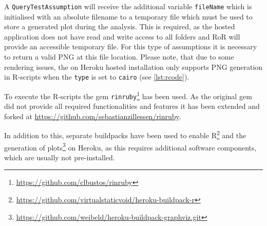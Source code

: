 A \texttt{QueryTestAssumption} will receive the additional variable \texttt{fileName} which is initialised with an absolute filename to a temporary file which must be used to store a generated plot during the analysis. This is required, as the hosted application does not have read and write access to all folders and \gls{RoR} will provide an accessible temporary file. For this type of assumptions it is necessary to return a valid PNG at this file location. Please note, that due to some rendering issues, the on Heroku hosted installation only supports PNG generation in R-scripts when the \texttt{type} is set to \texttt{cairo} (see \cref{lst:rcode}).

To execute the \gls{R}-scripts the gem \texttt{rinruby}\footnote{\url{https://github.com/clbustos/rinruby}} has been used. As the original gem did not provide all required functionalities and features it has been extended and forked at \href{https://github.com/sebastianzillessen/rinruby}{https://github.com/sebastianzillessen/rinruby}. 

In addition to this, separate buildpacks have been used to enable \gls{R}\footnote{\url{https://github.com/virtualstaticvoid/heroku-buildpack-r}} and the generation of plots\footnote{\url{https://github.com/weibeld/heroku-buildpack-graphviz.git}} on Heroku, as this requires additional software components, which are usually not pre-installed.


